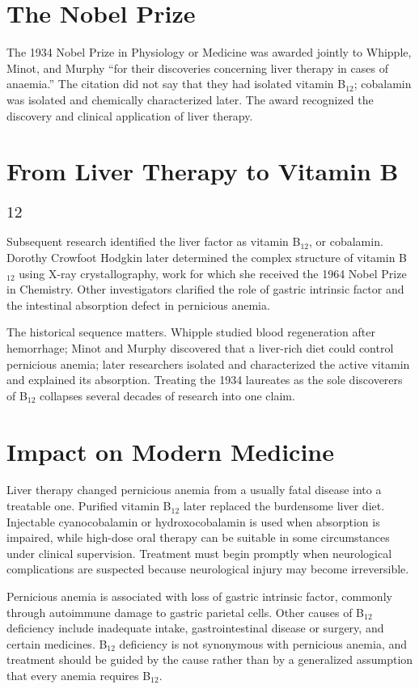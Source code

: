\section{The Nobel Prize}

The 1934 Nobel Prize in Physiology or Medicine was awarded jointly to Whipple, Minot, and Murphy ``for their discoveries concerning liver therapy in cases of anaemia.'' The citation did not say that they had isolated vitamin B$_{12}$; cobalamin was isolated and chemically characterized later. The award recognized the discovery and clinical application of liver therapy.

\section{From Liver Therapy to Vitamin \texorpdfstring{B$_{12}$}{B12}}

Subsequent research identified the liver factor as vitamin B$_{12}$, or cobalamin. Dorothy Crowfoot Hodgkin later determined the complex structure of vitamin B$_{12}$ using X-ray crystallography, work for which she received the 1964 Nobel Prize in Chemistry. Other investigators clarified the role of gastric intrinsic factor and the intestinal absorption defect in pernicious anemia.

The historical sequence matters. Whipple studied blood regeneration after hemorrhage; Minot and Murphy discovered that a liver-rich diet could control pernicious anemia; later researchers isolated and characterized the active vitamin and explained its absorption. Treating the 1934 laureates as the sole discoverers of B$_{12}$ collapses several decades of research into one claim.

\section{Impact on Modern Medicine}

Liver therapy changed pernicious anemia from a usually fatal disease into a treatable one. Purified vitamin B$_{12}$ later replaced the burdensome liver diet. Injectable cyanocobalamin or hydroxocobalamin is used when absorption is impaired, while high-dose oral therapy can be suitable in some circumstances under clinical supervision. Treatment must begin promptly when neurological complications are suspected because neurological injury may become irreversible.

Pernicious anemia is associated with loss of gastric intrinsic factor, commonly through autoimmune damage to gastric parietal cells. Other causes of B$_{12}$ deficiency include inadequate intake, gastrointestinal disease or surgery, and certain medicines. B$_{12}$ deficiency is not synonymous with pernicious anemia, and treatment should be guided by the cause rather than by a generalized assumption that every anemia requires B$_{12}$.

